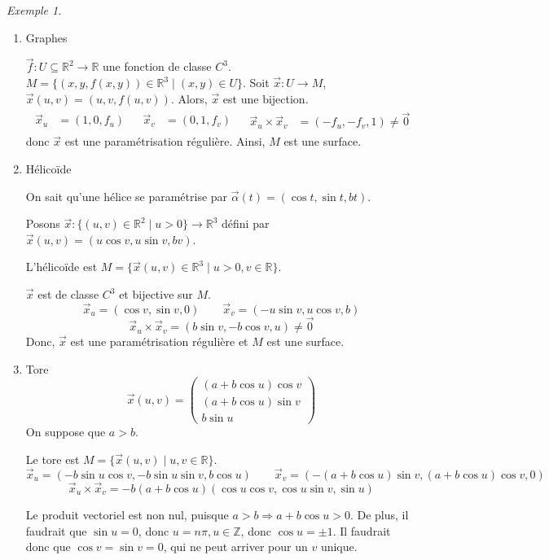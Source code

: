\documentclass{report}
\theoremstyle{definition}
\theoremstyle{remark}
\newtheorem*{exem}{Exemple}
\def\ZZ{\mathbb{Z}}
\def\RR{\mathbb{R}}
\begin{document}
	\begin{exem}
		\begin{enumerate}
			\item Graphes

			$\vec f:U\subseteq\RR^2\to\RR$ une fonction de classe $C^3$. $M=\{(x,y,f(x,y))\in\RR^3 \mid (x,y)\in U\}$. Soit $\vec x:U\to M$, $\vec x(u,v)=(u,v,f(u,v))$. Alors, $\vec x$ est une bijection.
			\begin{align*}
				\begin{split}
					\vec x_u&= (1,0,f_u)
				\end{split}
				&
				\begin{split}
					\vec x_v&= (0,1,f_v)
				\end{split}
				&
				\begin{split}
					\vec x_u \times \vec x_v&= (-f_u,-f_v,1) \neq \vec0
				\end{split}
			\end{align*}
			donc $\vec x$ est une param\'etrisation r\'eguli\`ere. Ainsi, $M$ est une surface.
			\item H\'elico\"ide

			On sait qu'une h\'elice se param\'etrise par $\vec\alpha(t) = (\cos t, \sin t, bt)$.

			Posons $\vec x: \{(u,v) \in \RR^2 \mid u>0\} \to \RR^3$ d\'efini par $\vec x(u,v) = (u\cos v, u\sin v, bv)$.

			L'h\'elico\"ide est $M=\{\vec x(u,v) \in \RR^3 \mid u>0, v\in\RR\}$.

			$\vec x$ est de classe $C^3$ et bijective sur $M$.
			\[ \vec x_u = (\cos v, \sin v, 0) \qquad \vec x_v = (-u\sin v, u\cos v, b) \] \[ \vec x_u \times \vec x_v = (b\sin v, -b\cos v, u) \neq \vec 0 \]
			Donc, $\vec x$ est une param\'etrisation r\'eguli\`ere et $M$ est une surface.
			\item Tore
			\[ \vec x(u,v) = \begin{pmatrix}
				(a+b\cos u)\cos v\\
				(a+b\cos u)\sin v\\
				b\sin u
			\end{pmatrix} \]
			On suppose que $a>b$.

			Le tore est $M = \{\vec x(u,v) \mid u,v\in\RR\}$.
			\[ \vec x_u = (-b\sin u\cos v, -b\sin u\sin v, b\cos u) \qquad \vec x_v = (-(a+b\cos u)\sin v, (a+b\cos u)\cos v, 0) \] \[ \vec x_u\times\vec x_v = -b(a+b\cos u) (\cos u\cos v, \cos u\sin v, \sin u) \]

			Le produit vectoriel est non nul, puisque $a>b \Longrightarrow a+b\cos u>0$. De plus, il faudrait que $\sin u=0$, donc $u=n\pi, u\in\ZZ$, donc $\cos u=\pm1$. Il faudrait donc que $\cos v=\sin v=0$, qui ne peut arriver pour un $v$ unique.


\end{enumerate}
\end{exem}
\end{document}
